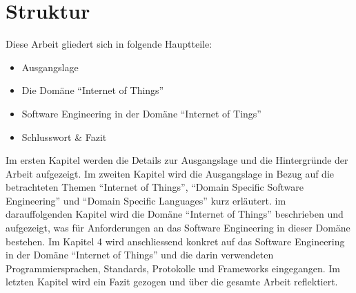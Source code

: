 \section{Struktur}
Diese Arbeit gliedert sich in folgende Hauptteile:

\begin{itemize}
\item Ausgangslage
\item Die Domäne "`Internet of Things"'
\item Software Engineering in der Domäne "`Internet of Tings"'
\item Schlusswort \& Fazit
\end{itemize}

Im ersten Kapitel werden die Details zur Ausgangslage und die Hintergründe der Arbeit aufgezeigt. Im zweiten Kapitel wird die Ausgangslage in Bezug auf die betrachteten Themen "`Internet of Things"', "`Domain Specific Software Engineering"' und "`Domain Specific Languages"' kurz erläutert. im darauffolgenden Kapitel wird die Domäne "`Internet of Things"' beschrieben und aufgezeigt, was für Anforderungen an das Software Engineering in dieser Domäne bestehen. Im Kapitel 4 wird anschliessend konkret auf das Software Engineering in der Domäne "`Internet of Things"' und die darin verwendeten Programmiersprachen, Standards, Protokolle und Frameworks eingegangen. Im letzten Kapitel wird ein Fazit gezogen und über die gesamte Arbeit reflektiert.